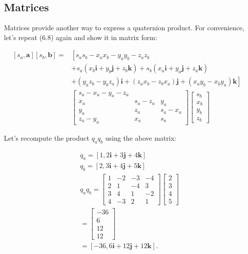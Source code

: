 \documentclass[10pt]{article}
\begin{document}
\subsection{Matrices}
Matrices provide another way to express a quaternion product. For convenience, let's repeat (6.8) again and show it in matrix form:

$$
\begin{aligned}
{\left[s_{a}, \mathbf{a}\right]\left[s_{b}, \mathbf{b}\right]=} & {\left[s_{a} s_{b}-x_{a} x_{b}-y_{a} y_{b}-z_{a} z_{b}\right.} \\
& +s_{a}\left(x_{b} \mathbf{i}+y_{b} \mathbf{j}+z_{b} \mathbf{k}\right)+s_{b}\left(x_{a} \mathbf{i}+y_{a} \mathbf{j}+z_{a} \mathbf{k}\right) \\
& \left.+\left(y_{a} z_{b}-y_{b} z_{a}\right) \mathbf{i}+\left(z_{a} x_{b}-z_{b} x_{a}\right) \mathbf{j}+\left(x_{a} y_{b}-x_{b} y_{a}\right) \mathbf{k}\right] \\
& {\left[\begin{array}{rrr}
s_{a}-x_{a}-y_{a}-z_{a} \\
x_{a} & s_{a}-z_{a} & y_{a} \\
y_{a} & z_{a} & s_{a}-x_{a} \\
z_{a}-y_{a} & x_{a} & s_{a}
\end{array}\right]\left[\begin{array}{c}
s_{b} \\
x_{b} \\
y_{b} \\
z_{b}
\end{array}\right] }
\end{aligned}
$$

Let's recompute the product $q_{a} q_{b}$ using the above matrix:

$$
\begin{aligned}
& q_{a}=[1,2 \mathbf{i}+3 \mathbf{j}+4 \mathbf{k}] \\
& q_{b}=[2,3 \mathbf{i}+4 \mathbf{j}+5 \mathbf{k}] \\
& q_{a} q_{b}=\left[\begin{array}{rrrr}
1 & -2 & -3 & -4 \\
2 & 1 & -4 & 3 \\
3 & 4 & 1 & -2 \\
4 & -3 & 2 & 1
\end{array}\right]\left[\begin{array}{l}
2 \\
3 \\
4 \\
5
\end{array}\right] \\
& =\left[\begin{array}{r}
-36 \\
6 \\
12 \\
12
\end{array}\right] \\
& =[-36,6 \mathbf{i}+12 \mathbf{j}+12 \mathbf{k}] \text {. }
\end{aligned}
$$
\end{document}
